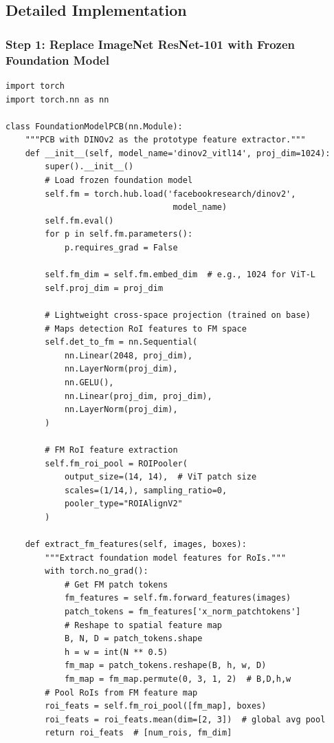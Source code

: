 \documentclass[11pt,a4paper]{article}
\begin{document}
\subsection{Detailed Implementation}

\subsubsection{Step 1: Replace ImageNet ResNet-101 with Frozen Foundation Model}

\begin{lstlisting}[caption={Foundation model feature extraction for PCB}]
import torch
import torch.nn as nn

class FoundationModelPCB(nn.Module):
    """PCB with DINOv2 as the prototype feature extractor."""
    def __init__(self, model_name='dinov2_vitl14', proj_dim=1024):
        super().__init__()
        # Load frozen foundation model
        self.fm = torch.hub.load('facebookresearch/dinov2',
                                  model_name)
        self.fm.eval()
        for p in self.fm.parameters():
            p.requires_grad = False

        self.fm_dim = self.fm.embed_dim  # e.g., 1024 for ViT-L
        self.proj_dim = proj_dim

        # Lightweight cross-space projection (trained on base)
        # Maps detection RoI features to FM space
        self.det_to_fm = nn.Sequential(
            nn.Linear(2048, proj_dim),
            nn.LayerNorm(proj_dim),
            nn.GELU(),
            nn.Linear(proj_dim, proj_dim),
            nn.LayerNorm(proj_dim),
        )

        # FM RoI feature extraction
        self.fm_roi_pool = ROIPooler(
            output_size=(14, 14),  # ViT patch size
            scales=(1/14,), sampling_ratio=0,
            pooler_type="ROIAlignV2"
        )

    def extract_fm_features(self, images, boxes):
        """Extract foundation model features for RoIs."""
        with torch.no_grad():
            # Get FM patch tokens
            fm_features = self.fm.forward_features(images)
            patch_tokens = fm_features['x_norm_patchtokens']
            # Reshape to spatial feature map
            B, N, D = patch_tokens.shape
            h = w = int(N ** 0.5)
            fm_map = patch_tokens.reshape(B, h, w, D)
            fm_map = fm_map.permute(0, 3, 1, 2)  # B,D,h,w
        # Pool RoIs from FM feature map
        roi_feats = self.fm_roi_pool([fm_map], boxes)
        roi_feats = roi_feats.mean(dim=[2, 3])  # global avg pool
        return roi_feats  # [num_rois, fm_dim]
\end{lstlisting}
\end{document}

